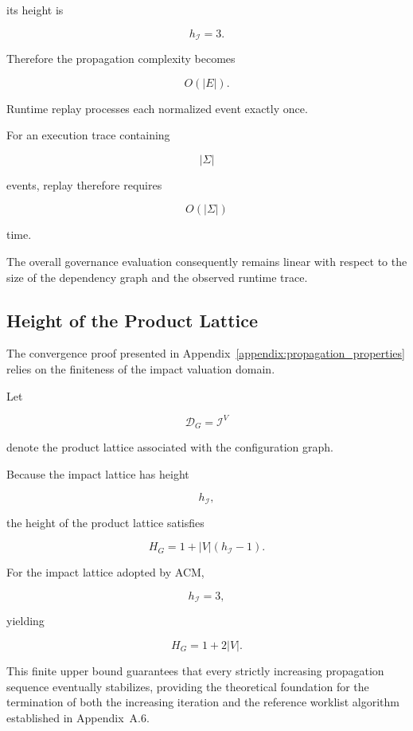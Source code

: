 \documentclass[10pt]{article}
\begin{document}
its height is

\[
h_{\mathcal I}=3.
\]

Therefore the propagation complexity becomes

\[
O(|E|).
\]

Runtime replay processes each normalized event exactly once.

For an execution trace containing

\[
|\Sigma|
\]

events, replay therefore requires

\[
O(|\Sigma|)
\]

time.

The overall governance evaluation consequently remains linear with respect to
the size of the dependency graph and the observed runtime trace.

\subsection{Height of the Product Lattice}
\label{appendix:lattice_height}

The convergence proof presented in Appendix~\ref{appendix:propagation_properties}
relies on the finiteness of the impact valuation domain.

Let

\[
\mathcal D_G
=
\mathcal I^{V}
\]

denote the product lattice associated with the configuration graph.

Because the impact lattice has height

\[
h_{\mathcal I},
\]

the height of the product lattice satisfies

\begin{equation}
	\label{eq:product_lattice_height}
	H_G
	=
	1
	+
	|V|
	\left(
	h_{\mathcal I}-1
	\right).
\end{equation}

For the impact lattice adopted by ACM,

\[
h_{\mathcal I}=3,
\]

yielding

\[
H_G
=
1+2|V|.
\]

This finite upper bound guarantees that every strictly increasing propagation
sequence eventually stabilizes, providing the theoretical foundation for the
termination of both the increasing iteration and the reference worklist
algorithm established in Appendix~A.6.



\end{document}
